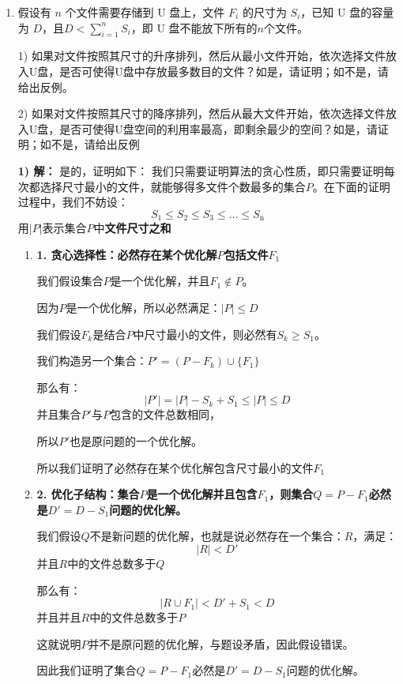 \documentclass[UTF8,12pt,a4paper]{ctexart}
\begin{document}
\begin{enumerate}[1.]
	重复此交换操作，直至所有相邻任务满足$e_{i_1}\le e_{i_2}\le\dots\le e_{i_n}$，即可得到一个按截止时间非递减排序的可行任务序列。

	\item 假设有 $n$ 个文件需要存储到 U 盘上，文件 $F_i$ 的尺寸为 $S_i$，已知 U 盘的容量为 $D$，且$D<\sum_{i=1}^{n}S_i$，即 U 盘不能放下所有的$n$个文件。

	1) 如果对文件按照其尺寸的升序排列，然后从最小文件开始，依次选择文件放入U盘，是否可使得U盘中存放最多数目的文件？如是，请证明；如不是，请给出反例。

	2) 如果对文件按照其尺寸的降序排列，然后从最大文件开始，依次选择文件放入U盘，是否可使得U盘空间的利用率最高，即剩余最少的空间？如是，请证明；如不是，请给出反例

	\textbf{1) 解：}
	是的，证明如下：
	我们只需要证明算法的贪心性质，即只需要证明每次都选择尺寸最小的文件，就能够得多文件个数最多的集合$P$。在下面的证明过程中，我们不妨设：
	$$S_1 \leq S_2 \leq S_3 \leq \dots \leq S_\text{n}$$
	用$|P|$表示集合$P$中\textbf{文件尺寸之和}
	\begin{enumerate}
		\item \textbf{1. 贪心选择性：必然存在某个优化解$P$包括文件$F_1$}
		
		我们假设集合$P$是一个优化解，并且$F_1 \notin P$。
		
		因为$P$是一个优化解，所以必然满足：$|P| \leq D$
		
		我们假设$F_k$是结合$P$中尺寸最小的文件，则必然有$S_k \geq S_1$。
		
		我们构造另一个集合：$P' = (P - F_k) \cup \{F_1\}$
		
		那么有：
		$$|P'| = |P| - S_k + S_1 \leq |P| \leq D $$
		并且集合$P'$与$P$包含的文件总数相同，

		所以$P'$也是原问题的一个优化解。

		所以我们证明了必然存在某个优化解包含尺寸最小的文件$F_1$
		
		\item \textbf{2. 优化子结构：集合$P$是一个优化解并且包含$F_1$，则集合$Q = P - F_1$必然是$D' = D - S_1$问题的优化解。}
		
		我们假设$Q$不是新问题的优化解，也就是说必然存在一个集合：$R$，满足：
		$$|R| < D'$$
		并且$R$中的文件总数多于$Q$
		
		那么有：
		$$|R \cup {F_1}| < D' + S_1 < D$$
		并且并且$R$中的文件总数多于$P$
		
		这就说明$P$并不是原问题的优化解，与题设矛盾，因此假设错误。

		因此我们证明了集合$Q = P - F_1$必然是$D' = D - S_1$问题的优化解。


\end{enumerate}
\end{enumerate}
\end{document}
